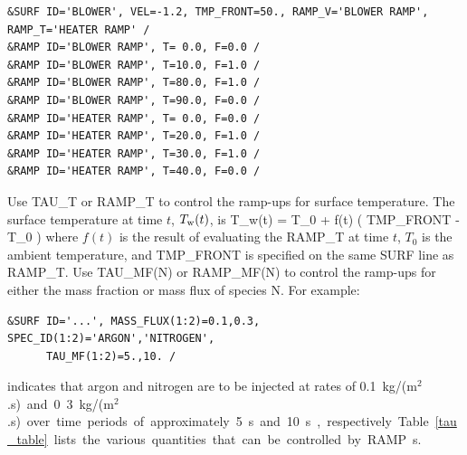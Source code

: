 \documentclass[11pt]{book}
\begin{document}
\begin{lstlisting}
&SURF ID='BLOWER', VEL=-1.2, TMP_FRONT=50., RAMP_V='BLOWER RAMP', RAMP_T='HEATER RAMP' /
&RAMP ID='BLOWER RAMP', T= 0.0, F=0.0 /
&RAMP ID='BLOWER RAMP', T=10.0, F=1.0 /
&RAMP ID='BLOWER RAMP', T=80.0, F=1.0 /
&RAMP ID='BLOWER RAMP', T=90.0, F=0.0 /
&RAMP ID='HEATER RAMP', T= 0.0, F=0.0 /
&RAMP ID='HEATER RAMP', T=20.0, F=1.0 /
&RAMP ID='HEATER RAMP', T=30.0, F=1.0 /
&RAMP ID='HEATER RAMP', T=40.0, F=0.0 /
\end{lstlisting}
Use {\ct TAU\_T} or {\ct RAMP\_T} to control the ramp-ups for surface temperature. The surface temperature at time $t$, $T_{\rm w}(t)$, is
\be
   T_{\rm w}(t) = T_0 + f(t) \left( {\ct TMP\_FRONT} - T_0 \right)
\ee
where $f(t)$ is the result of evaluating the {\ct RAMP\_T} at time $t$, $T_0$ is the ambient temperature, and {\ct TMP\_FRONT} is specified on the same {\ct SURF} line as {\ct RAMP\_T}. Use {\ct TAU\_MF(N)} or {\ct RAMP\_MF(N)} to control the ramp-ups for either the mass fraction or mass flux of species {\ct N}. For example:
\begin{lstlisting}
&SURF ID='...', MASS_FLUX(1:2)=0.1,0.3, SPEC_ID(1:2)='ARGON','NITROGEN',
      TAU_MF(1:2)=5.,10. /
\end{lstlisting}
indicates that argon and nitrogen are to be injected at rates of 0.1~\si{kg/(m$^2$.s)} and 0.3~\si{kg/(m$^2$.s)} over time periods of approximately 5~s and 10~s, respectively.

Table~\ref{tau_table} lists the various quantities that can be controlled by {\ct RAMP}s.
\end{document}
